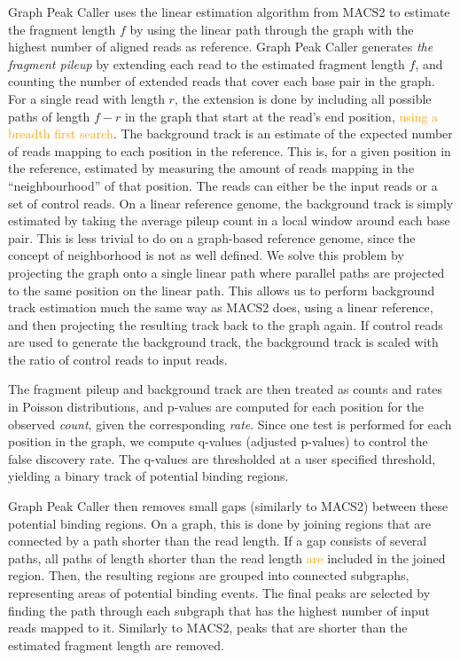 \documentclass[10pt,letterpaper]{article}
\newcommand{\revision}[1]{\textcolor{orange}{#1}}
\begin{document}
Graph Peak Caller uses the linear estimation algorithm from MACS2 to estimate the fragment length $f$ by using the linear path through the graph with the highest number of aligned reads as reference.
Graph Peak Caller generates \emph{the fragment pileup} by extending each read to the estimated fragment length $f$, and counting the number of extended reads that cover each base pair in the graph. For a single read with length $r$, the extension is done by including all possible paths of length $f-r$ in the graph that start at the read’s end position, \revision{using a breadth first search}. 
The background track is an estimate of the expected number of reads mapping to each position in the reference. This is, for a given position in the reference, estimated by measuring the amount of reads mapping in the “neighbourhood” of that position. The reads can either be the input reads or a set of control reads. On a linear reference genome, the background track is simply estimated by taking the average pileup count in a local window around each base pair. This is less trivial to do on a graph-based reference genome, since the concept of neighborhood is not as well defined. We solve this problem by projecting the graph onto a single linear path where parallel paths are projected to the same position on the linear path. This allows us to perform background track estimation much the same way as MACS2 does, using a linear reference, and then projecting the resulting track back to the graph again. If control reads are used to generate the background track, the background track is scaled with the ratio of control reads to input reads.
	
The fragment pileup and background track are then treated as counts and rates in Poisson distributions, and p-values are computed for each position for the observed \emph{count}, given the corresponding \emph{rate}. Since one test is performed for each position in the graph, we compute q-values (adjusted p-values) to control the false discovery rate. The q-values are thresholded at a user specified threshold, yielding a binary track of potential binding regions. 

Graph Peak Caller then removes small gaps (similarly to MACS2) between these potential binding regions.
On a graph, this is done by joining regions that are connected by a path shorter than the read length.
If a gap consists of several paths, all paths of length shorter than the read length \revision{are} included in the joined region.
Then, the resulting regions are grouped into connected subgraphs, representing areas of potential binding events. The final peaks are selected by finding the path through each subgraph that has the highest number of input reads mapped to it. Similarly to MACS2, peaks that are shorter than the estimated fragment length are removed. 
\end{document}
